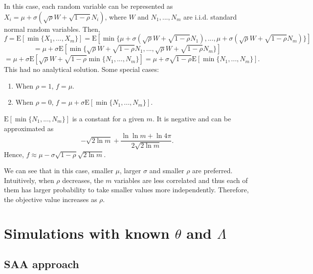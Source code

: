 \documentclass[opre,sglanonrev]{informs4}
\begin{document}
In this case, each random variable can be represented as $X_i = \mu + \sigma(\sqrt{\rho}W + \sqrt{1-\rho} N_i )$, where $W$ and $N_1,...,N_m$ are i.i.d. standard normal random variables. Then,
$$f = \text{E}[\min\{X_1,...,X_m\}] =  \text{E}[\min\{\mu + \sigma(\sqrt{\rho}W + \sqrt{1-\rho} N_1 ),...,\mu + \sigma(\sqrt{\rho}W + \sqrt{1-\rho} N_m )\}] $$
$$=\mu+ \sigma\text{E}[\min\{\sqrt{\rho}W + \sqrt{1-\rho} N_1 ,...,\sqrt{\rho}W + \sqrt{1-\rho} N_m \}]  $$
$$=\mu + \sigma\text{E}[\sqrt{\rho}W+ \sqrt{1-\rho} \min\{N_1,...,N_m\} ] =\mu + \sigma\sqrt{1-\rho} \text{E}[\min\{N_1,...,N_m\} ]. $$
This had no analytical solution. Some special cases:
\begin{enumerate}
	\item When $\rho =1$, $f=\mu$.
	\item When $\rho =0$, $f = \mu+ \sigma\text{E}[\min\{N_1 ,...,N_m \}]$. 
\end{enumerate}
$\text{E}[\min\{N_1 ,...,N_m \}]$ is a constant for a given $m$. It is negative and can be approximated as 
$$-\sqrt{2 \ln m} + \frac{\ln \ln m + \ln 4\pi}{ 2 \sqrt{2 \ln m}}. $$
Hence, $f\approx \mu - \sigma\sqrt{1-\rho}\sqrt{2 \ln m}$. 

We can see that in this case, smaller $\mu$, larger $\sigma$ and smaller $\rho$ are preferred. Intuitively, when $\rho$ decreases, the $m$ variables are less correlated and thus each of them has larger probability to take smaller values more independently. Therefore, the objective value increases as $\rho$. 

\section{Simulations with known $\theta$ and $\Lambda$}
\subsection{SAA approach}
\end{document}
